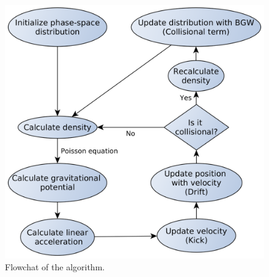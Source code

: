 \begin{figure}[ht!]
    \centering
    \includegraphics[scale=0.2]{imag/flowchart.png}
    \caption{Flowchat of the algorithm.}
    \label{flowchart}
\end{figure}

